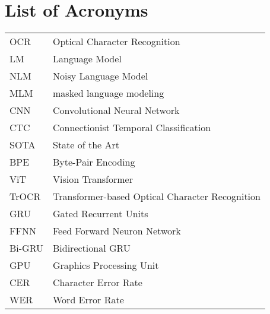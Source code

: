 {}
\chapter*{List of Acronyms}

\begin{supertabular}{lp{12.5cm}}
OCR & Optical Character Recognition\\
LM & Language Model\\
NLM & Noisy Language Model\\
MLM & masked language modeling\\
CNN & Convolutional Neural Network\\
CTC & Connectionist Temporal Classification\\
SOTA & State of the Art\\
BPE & Byte-Pair Encoding\\
ViT & Vision Transformer\\
TrOCR & Transformer-based Optical Character Recognition\\
GRU & Gated Recurrent Units\\
FFNN & Feed Forward Neuron Network\\
Bi-GRU & Bidirectional GRU\\
GPU & Graphics Processing Unit\\
CER & Character Error Rate\\
WER & Word Error Rate\\
\end{supertabular}

\newpage